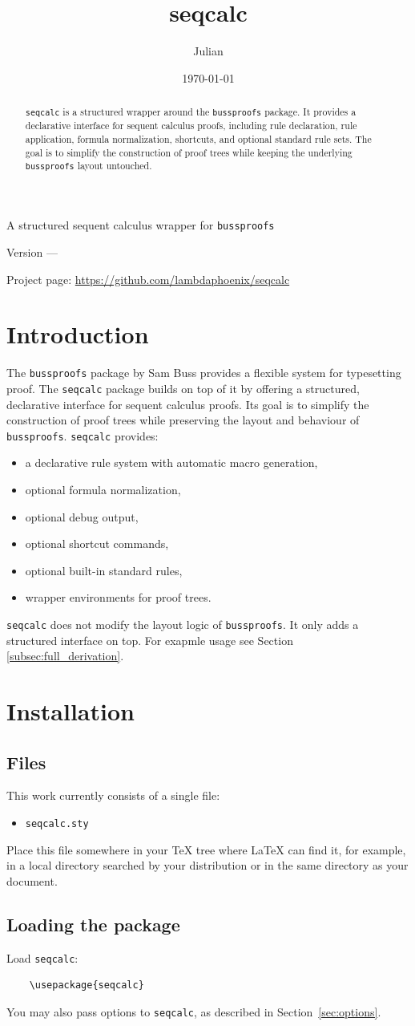 \documentclass[a4paper,1pt]{article}
\title{\textbf{seqcalc}}
\author{Julian}
\date{\today}
\makeatletter
\renewcommand{\maketitle}{
    \begin{titlepage}
    \centering
    {\Huge\bfseries\color{seqblue} \@title \par}
    \vspace{0.5cm}
    {\Large A structured sequent calculus wrapper for \texttt{bussproofs}\par} \vspace{1.5cm}
    {\large \@author \par} \vspace{0.5cm}
    {\large Version \seqcalcVersion{} — \@date \par} \vspace{1.5cm}
    
    \begin{tcolorbox}[ width=0.85\textwidth, colback=seqlight, colframe=seqblue, arc=2pt, boxrule=0.8pt, left=8pt,right=8pt,top=8pt,bottom=8pt, ]
        \small\centering\begin{abstract}
            \texttt{seqcalc} is a structured wrapper around the \texttt{bussproofs} package. It provides a declarative interface for sequent calculus proofs, including rule declaration, rule application, formula normalization, shortcuts, and optional standard rule sets. The goal is to simplify the construction of proof trees while keeping the underlying \texttt{bussproofs} layout untouched.
        \end{abstract}
    \end{tcolorbox}
    \vfill
    {\small Project page: \url{https://github.com/lambdaphoenix/seqcalc}\par}
\end{titlepage} }
\makeatother
\begin{document}
\maketitle

\tableofcontents
\newpage

\section{Introduction}

The \texttt{bussproofs} package by Sam Buss provides a flexible system for typesetting proof. The \texttt{seqcalc} package builds on top of it by offering a structured, declarative interface for sequent calculus proofs. Its goal is to simplify the construction of proof trees while preserving the layout and behaviour of \texttt{bussproofs}.
\texttt{seqcalc} provides:
\begin{itemize}
    \item a declarative rule system with automatic macro generation,
    \item optional formula normalization,
    \item optional debug output,
    \item optional shortcut commands,
    \item optional built-in standard rules,
    \item wrapper environments for proof trees.
\end{itemize}
\texttt{seqcalc} does not modify the layout logic of \texttt{bussproofs}. It only adds a structured interface on top. For exapmle usage see Section \ref{subsec:full_derivation}.

\section{Installation}
\subsection{Files}
This work currently consists of a single file:
\begin{itemize}
    \item \texttt{seqcalc.sty}
\end{itemize}
Place this file somewhere in your \TeX{} tree where \LaTeX{} can find it, for example, in a local directory searched by your distribution or in the same directory as your document.

\subsection{Loading the package}
Load \texttt{seqcalc}:
\begin{lstlisting}
    \usepackage{seqcalc}
\end{lstlisting}
You may also pass options to \texttt{seqcalc}, as
described in Section~\ref{sec:options}.
\end{document}
